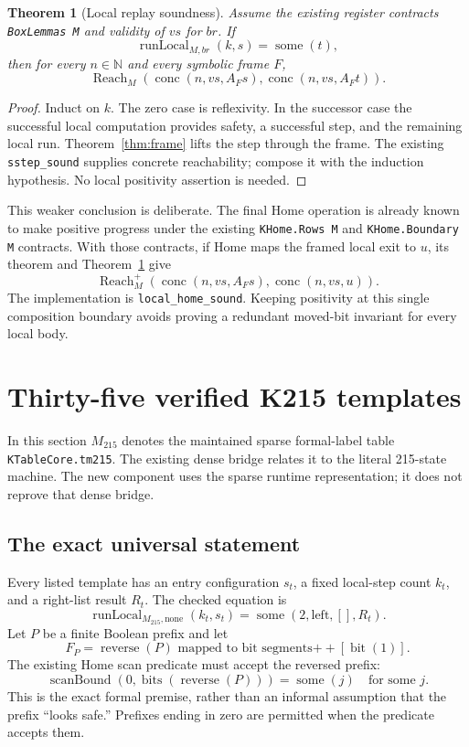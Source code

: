 \documentclass[11pt,letterpaper]{article}
\newtheorem{theorem}{Theorem}[section]
\theoremstyle{definition}
\theoremstyle{remark}
\newcommand{\N}{\mathbb N}
\newcommand{\Some}{\operatorname{some}}
\newcommand{\Reach}{\operatorname{Reach}}
\newcommand{\ReachOne}{\operatorname{Reach}^{+}}
\newcommand{\code}[1]{\texttt{#1}}
\begin{document}
\begin{theorem}[Local replay soundness]
\label{thm:replay}
Assume the existing register contracts \code{BoxLemmas M} and validity of
$vs$ for $br$. If
\[
 \operatorname{runLocal}_{M,br}(k,s)=\Some(t),
\]
then for every $n\in\N$ and every symbolic frame $F$,
\[
 \Reach_M(\operatorname{conc}(n,vs,A_Fs),
          \operatorname{conc}(n,vs,A_Ft)).
\]
\end{theorem}

\begin{proof}
Induct on $k$. The zero case is reflexivity. In the successor case the
successful local computation provides safety, a successful step, and the
remaining local run. Theorem~\ref{thm:frame} lifts the step through the
frame. The existing \code{sstep\_sound} supplies concrete reachability;
compose it with the induction hypothesis. No local positivity assertion is
needed.
\end{proof}

This weaker conclusion is deliberate. The final Home operation is already
known to make positive progress under the existing \code{KHome.Rows M} and
\code{KHome.Boundary M} contracts. With those contracts, if Home maps the
framed local exit to $u$, its theorem and Theorem~\ref{thm:replay} give
\[
 \ReachOne_M(\operatorname{conc}(n,vs,A_Fs),
             \operatorname{conc}(n,vs,u)).
\]
The implementation is \code{local\_home\_sound}. Keeping positivity at this
single composition boundary avoids proving a redundant moved-bit invariant
for every local body.

\section{Thirty-five verified K215 templates}
\label{sec:templates}

In this section $M_{215}$ denotes the maintained sparse formal-label table
\code{KTableCore.tm215}. The existing dense bridge relates it to the literal
215-state machine. The new component uses the sparse runtime representation;
it does not reprove that dense bridge.

\subsection{The exact universal statement}

Every listed template has an entry configuration $s_t$, a fixed local-step
count $k_t$, and a right-list result $R_t$. The checked equation is
\[
 \operatorname{runLocal}_{M_{215},\mathrm{none}}(k_t,s_t)
       =\Some(2,\mathrm{left},[],R_t).
\]
Let $P$ be a finite Boolean prefix and let
\[
 F_P=\operatorname{reverse}(P)\text{ mapped to bit segments}
            \mathbin{++}[\operatorname{bit}(1)].
\]
The existing Home scan predicate must accept the reversed prefix:
\[
 \operatorname{scanBound}(0,\operatorname{bits}(\operatorname{reverse}(P)))=\Some(j)
 \quad\text{for some }j.
\]
This is the exact formal premise, rather than an informal assumption that
the prefix ``looks safe.'' Prefixes ending in zero are permitted when the
predicate accepts them.
\end{document}
